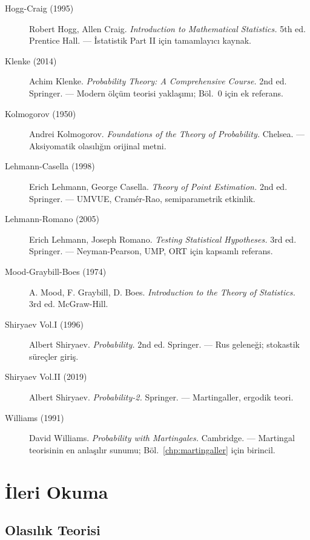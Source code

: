 \begin{description}
  \item[Hogg-Craig (1995)] Robert Hogg, Allen Craig. \textit{Introduction to Mathematical Statistics.} 5th ed. Prentice Hall. — İstatistik Part II için tamamlayıcı kaynak.

  \item[Klenke (2014)] Achim Klenke. \textit{Probability Theory: A Comprehensive Course.} 2nd ed. Springer. — Modern ölçüm teorisi yaklaşımı; Böl.~0 için ek referans.

  \item[Kolmogorov (1950)] Andrei Kolmogorov. \textit{Foundations of the Theory of Probability.} Chelsea. — Aksiyomatik olasılığın orijinal metni.

  \item[Lehmann-Casella (1998)] Erich Lehmann, George Casella. \textit{Theory of Point Estimation.} 2nd ed. Springer. — UMVUE, Cramér-Rao, semiparametrik etkinlik.

  \item[Lehmann-Romano (2005)] Erich Lehmann, Joseph Romano. \textit{Testing Statistical Hypotheses.} 3rd ed. Springer. — Neyman-Pearson, UMP, ORT için kapsamlı referans.

  \item[Mood-Graybill-Boes (1974)] A. Mood, F. Graybill, D. Boes. \textit{Introduction to the Theory of Statistics.} 3rd ed. McGraw-Hill.

  \item[Shiryaev Vol.I (1996)] Albert Shiryaev. \textit{Probability.} 2nd ed. Springer. — Rus geleneği; stokastik süreçler giriş.

  \item[Shiryaev Vol.II (2019)] Albert Shiryaev. \textit{Probability-2.} Springer. — Martingaller, ergodik teori.

  \item[Williams (1991)] David Williams. \textit{Probability with Martingales.} Cambridge. — Martingal teorisinin en anlaşılır sunumu; Böl.~\ref{chp:martingaller} için birincil.
\end{description}

\section{İleri Okuma}

\subsection{Olasılık Teorisi}

